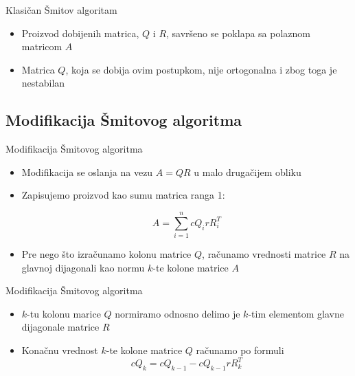 \documentclass[serbian]{beamer}
\begin{document}
\begin{frame}{Klasičan Šmitov algoritam}
	
	\begin{itemize}
		\item Proizvod dobijenih matrica, $Q$ i $R$, savršeno se poklapa sa polaznom matricom $A$
		\item Matrica $Q$, koja se dobija ovim postupkom, nije ortogonalna i zbog toga je nestabilan
	\end{itemize}
	
\end{frame}

\subsection{Modifikacija Šmitovog algoritma}
\begin{frame}{Modifikacija Šmitovog algoritma}

	\begin{itemize}
		\item Modifikacija se oslanja na vezu $A = QR$ u malo drugačijem obliku
		\item Zapisujemo proizvod kao sumu matrica ranga 1:
		
		$$A = \sum_{i=1}^{n} cQ_irR_i^T $$
		
		\item Pre nego što izračunamo kolonu matrice $Q$, računamo vrednosti matrice $R$ na glavnoj dijagonali kao normu $k$-te kolone matrice $A$	
	\end{itemize}

\end{frame}

\begin{frame}{Modifikacija Šmitovog algoritma}

	\begin{itemize}
		\item  $k$-tu kolonu marice $Q$ normiramo odnosno delimo je $k$-tim elementom glavne dijagonale matrice $R$
		\item Konačnu vrednost $k$-te kolone matrice $Q$ računamo po formuli
		$$cQ_k = cQ_{k-1} - cQ_{k-1}rR_k^T$$	
	\end{itemize}
\end{frame}
\end{document}
